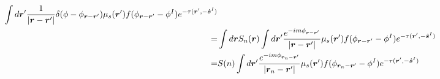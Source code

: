 \documentclass [10pt,letterpaper]{article}
\renewcommand{\vec}{\vectorsym}
\newcommand{\unitvec}[1]{\hat{\vec{#1}}}
\begin{document}
\begin{subequations}
\begin{align}
\begin{split}
			\int d\vec{r}^\prime
			\frac
			{1}
			{\lvert \vec{r}-\vec{r}^\prime \rvert}
			\delta(\phi-\phi_{\vec{r}-\vec{r}^\prime})
			\mu_s(\vec{r}^\prime)
			f(\phi_{\vec{r}-\vec{r}^\prime}-\phi^I)
			e^{-\tau(\vec{r}^\prime,-\unitvec{s}^I)} 
			\\
			=&
			\int d\vec{r}
			S_n(\vec{r})
			\int d\vec{r}^\prime
			\frac
			{
				e^{-i m \phi_{\vec{r}-\vec{r}^\prime}}
			}
			{\lvert \vec{r}-\vec{r}^\prime \rvert}
			\mu_s(\vec{r}^\prime)
			f(\phi_{\vec{r}-\vec{r}^\prime}-\phi^I)
			e^{-\tau(\vec{r}^\prime,-\unitvec{s}^I)} 
			\\
			=&
			S(n)
			\int d\vec{r}^\prime
			\frac
			{
				e^{-i m \phi_{\vec{r}_n-\vec{r}^\prime}}
			}
			{\lvert \vec{r}_n-\vec{r}^\prime \rvert}
			\mu_s(\vec{r}^\prime)
			f(\phi_{\vec{r}_n-\vec{r}^\prime}-\phi^I)
			e^{-\tau(\vec{r}^\prime,-\unitvec{s}^I)} 
		\end{split}
		\label{eq:der-Vscnm-1pt}
	\end{align}
\end{subequations}
\end{document}
